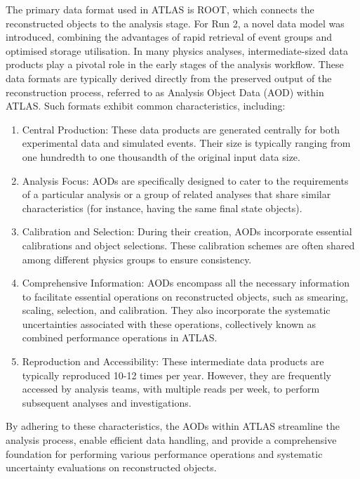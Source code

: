 The primary data format used in ATLAS is ROOT\cite{Brun:1997pa}, which connects the reconstructed 
objects to the analysis stage. For Run 2, a novel data model was introduced, combining the advantages 
of rapid retrieval of event groups and optimised storage utilisation. In many physics analyses, intermediate-sized
 data products play a pivotal role in the early stages of the analysis workflow. These data formats are 
 typically derived directly from the preserved output of the reconstruction process, referred to as 
 Analysis Object Data (AOD) within ATLAS. Such formats exhibit common characteristics, including:
 
 \begin{enumerate}
 	\item Central Production: These data products are generated centrally for both experimental data and simulated events. 
		Their size is typically ranging from one hundredth to one thousandth of the original input data size.

 	\item Analysis Focus: AODs are specifically designed to cater to the requirements 
		of a particular analysis or a group of related analyses that share similar characteristics 
		(for instance, having the same final state objects).

 	\item Calibration and Selection: During their creation, AODs incorporate essential calibrations and 
		object selections. These calibration schemes are often shared among different physics 
		groups to ensure consistency.

  	\item Comprehensive Information: AODs encompass all the necessary information to 
		facilitate essential operations on reconstructed objects, such as smearing, scaling, 
		selection, and calibration. They also incorporate the systematic uncertainties associated 
		with these operations, collectively known as combined performance operations in ATLAS.

 	\item Reproduction and Accessibility: These intermediate data products are typically 
		reproduced 10-12 times per year. However, they are frequently accessed by 
		analysis teams, with multiple reads per week, to perform subsequent analyses 
		and investigations.


 \end{enumerate}
 By adhering to these characteristics, the AODs within ATLAS streamline the 
 analysis process, enable efficient data handling, and provide a comprehensive foundation 
 for performing various performance operations and systematic uncertainty evaluations on 
 reconstructed objects.
 
